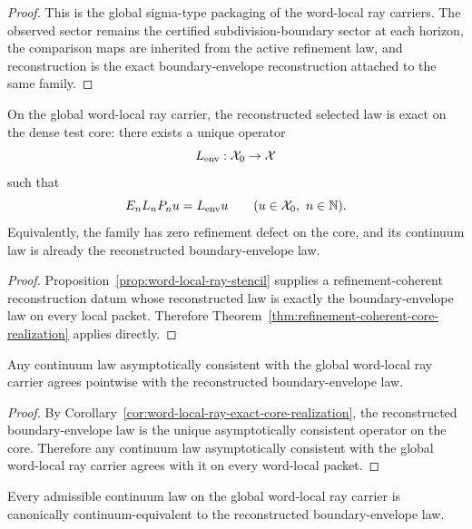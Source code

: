 \begin{proof}
This is the global sigma-type packaging of the word-local ray carriers. The
observed sector remains the certified subdivision-boundary sector at each
horizon, the comparison maps are inherited from the active refinement law, and
reconstruction is the exact boundary-envelope reconstruction attached to the
same family.
\end{proof}

\begin{corollary}
\label{cor:word-local-ray-exact-core-realization}
On the global word-local ray carrier, the reconstructed selected law is exact
on the dense test core: there exists a unique operator
\[
L_{\mathrm{env}}:\mathcal{X}_0\to\mathcal{X}
\]
such that
\[
E_nL_nP_nu = L_{\mathrm{env}}u
\qquad (u\in\mathcal{X}_0,\ n\in\mathbb{N}).
\]
Equivalently, the family has zero refinement defect on the core, and its
continuum law is already the reconstructed boundary-envelope law.
\end{corollary}

\begin{proof}
Proposition~\ref{prop:word-local-ray-stencil} supplies a refinement-coherent
reconstruction datum whose reconstructed law is exactly the
boundary-envelope law on every local packet. Therefore
Theorem~\ref{thm:refinement-coherent-core-realization} applies directly.
\end{proof}

\begin{proposition}
\label{prop:word-local-ray-forcing}
Any continuum law asymptotically consistent with the global word-local ray
carrier agrees pointwise with the reconstructed boundary-envelope law.
\end{proposition}

\begin{proof}
By Corollary~\ref{cor:word-local-ray-exact-core-realization}, the reconstructed
boundary-envelope law is the unique asymptotically consistent operator on the
core. Therefore any continuum law asymptotically consistent with the global
word-local ray carrier agrees with it on every word-local packet.
\end{proof}

\begin{corollary}
\label{cor:word-local-ray-equivalence}
Every admissible continuum law on the global word-local ray carrier is
canonically continuum-equivalent to the reconstructed boundary-envelope law.
\end{corollary}


